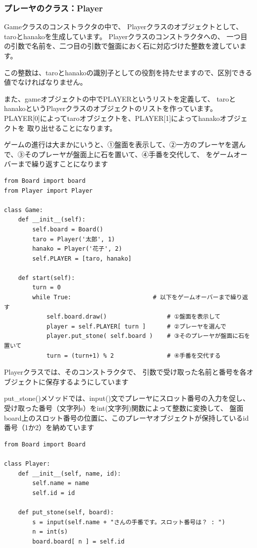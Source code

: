 \documentclass[uplatex,a4paper,11pt,oneside,openany]{jsbook}
\begin{document}
\subsubsection{プレーヤのクラス：Player}

Gameクラスのコンストラクタの中で、
Playerクラスのオブジェクトとして、taroとhanakoを生成しています。
Playerクラスのコンストラクタへの、
一つ目の引数で名前を、二つ目の引数で盤面におく石に対応づけた整数を渡しています。

この整数は、taroとhanakoの識別子としての役割を持たせますので、区別できる値でなければなりません。

また、gameオブジェクトの中でPLAYERというリストを定義して、
taroとhanakoというPlayerクラスのオブジェクトのリストを作っています。
PLAYER[0]によってtaroオブジェクトを、PLAYER[1]によってhanakoオブジェクトを
取り出せることになります。

ゲームの進行は大まかにいうと、①盤面を表示して、②一方のプレーヤを選んで、③そのプレーヤが盤面上に石を置いて、④手番を交代して、
をゲームオーバーまで繰り返すことになります

\begin{lstlisting}[caption=class Game,label=prog03-1]
from Board import board
from Player import Player

class Game:
    def __init__(self):
        self.board = Board()
        taro = Player('太郎', 1)
        hanako = Player('花子', 2)
        self.PLAYER = [taro, hanako]

    def start(self):
        turn = 0
        while True:                       # 以下をゲームオーバーまで繰り返す
            self.board.draw()                 # ①盤面を表示して
            player = self.PLAYER[ turn ]      # ②プレーヤを選んで
            player.put_stone( self.board )    # ③そのプレーヤが盤面に石を置いて
            turn = (turn+1) % 2               # ④手番を交代する
\end{lstlisting}%

Playerクラスでは、そのコンストラクタで、
引数で受け取った名前と番号を各オブジェクトに保存するようにしています

put\_stone()メソッドでは、input()文でプレーヤにスロット番号の入力を促し、
受け取った番号（文字列s）をint(文字列)関数によって整数に変換して、
盤面board上のスロット番号の位置に、このプレーヤオブジェクトが保持しているid番号（1か2）を納めています

\begin{lstlisting}[caption=class Player,label=prog03-2]
from Board import Board

class Player:
    def __init__(self, name, id):
        self.name = name
        self.id = id

    def put_stone(self, board):
        s = input(self.name + "さんの手番です。スロット番号は？ : ")
        n = int(s)
        board.board[ n ] = self.id
\end{lstlisting}%
\end{document}
